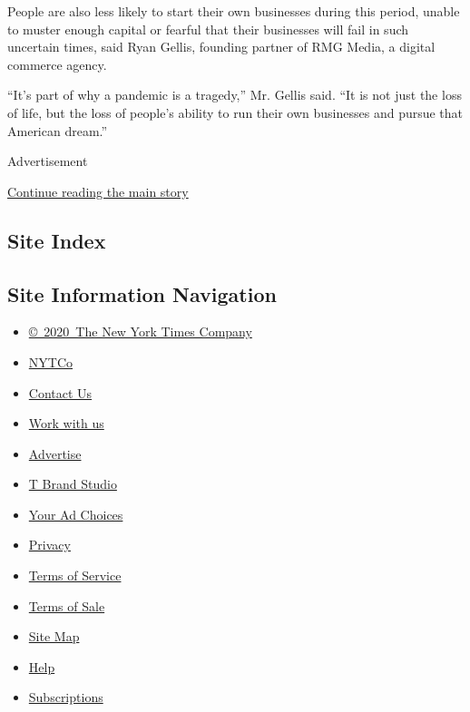 People are also less likely to start their own businesses during this
period, unable to muster enough capital or fearful that their businesses
will fail in such uncertain times, said Ryan Gellis, founding partner of
RMG Media, a digital commerce agency.

``It's part of why a pandemic is a tragedy,'' Mr. Gellis said. ``It is
not just the loss of life, but the loss of people's ability to run their
own businesses and pursue that American dream.''

Advertisement

\protect\hyperlink{after-bottom}{Continue reading the main story}

\hypertarget{site-index}{%
\subsection{Site Index}\label{site-index}}

\hypertarget{site-information-navigation}{%
\subsection{Site Information
Navigation}\label{site-information-navigation}}

\begin{itemize}
\tightlist
\item
  \href{https://help.nytimes3xbfgragh.onion/hc/en-us/articles/115014792127-Copyright-notice}{©~2020~The
  New York Times Company}
\end{itemize}

\begin{itemize}
\tightlist
\item
  \href{https://www.nytco.com/}{NYTCo}
\item
  \href{https://help.nytimes3xbfgragh.onion/hc/en-us/articles/115015385887-Contact-Us}{Contact
  Us}
\item
  \href{https://www.nytco.com/careers/}{Work with us}
\item
  \href{https://nytmediakit.com/}{Advertise}
\item
  \href{http://www.tbrandstudio.com/}{T Brand Studio}
\item
  \href{https://www.nytimes3xbfgragh.onion/privacy/cookie-policy\#how-do-i-manage-trackers}{Your
  Ad Choices}
\item
  \href{https://www.nytimes3xbfgragh.onion/privacy}{Privacy}
\item
  \href{https://help.nytimes3xbfgragh.onion/hc/en-us/articles/115014893428-Terms-of-service}{Terms
  of Service}
\item
  \href{https://help.nytimes3xbfgragh.onion/hc/en-us/articles/115014893968-Terms-of-sale}{Terms
  of Sale}
\item
  \href{https://spiderbites.nytimes3xbfgragh.onion}{Site Map}
\item
  \href{https://help.nytimes3xbfgragh.onion/hc/en-us}{Help}
\item
  \href{https://www.nytimes3xbfgragh.onion/subscription?campaignId=37WXW}{Subscriptions}
\end{itemize}
